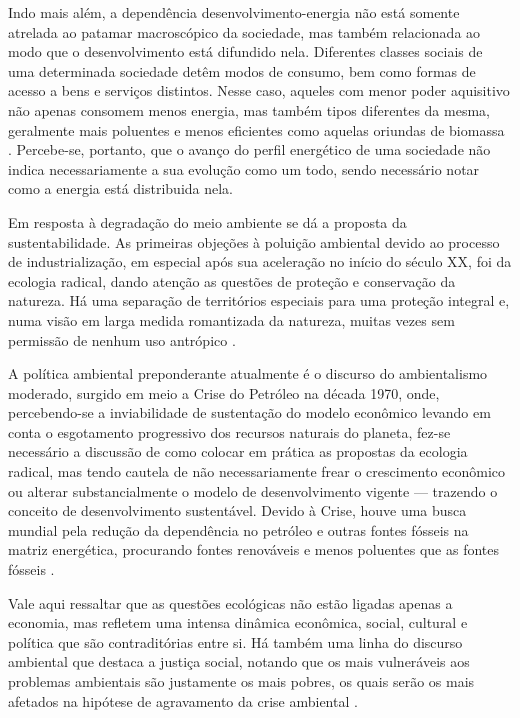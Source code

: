Indo mais além, a dependência desenvolvimento-energia não está somente
atrelada ao patamar macroscópico da sociedade, mas também relacionada
ao modo que o desenvolvimento está difundido nela. Diferentes classes
sociais de uma determinada sociedade detêm modos de consumo, bem como
formas de acesso a bens e serviços distintos. Nesse caso, aqueles com
menor poder aquisitivo não apenas consomem menos energia, mas também
tipos diferentes da mesma, geralmente mais poluentes e menos
eficientes como aquelas oriundas de biomassa
\cite{rippel}. Percebe-se, portanto, que o avanço do perfil energético
de uma sociedade não indica necessariamente a sua evolução como um
todo, sendo necessário notar como a energia está distribuida nela.

Em resposta à degradação do meio ambiente se dá a proposta da
sustentabilidade. As primeiras objeções à poluição ambiental devido ao processo 
de industrialização, em especial após sua aceleração no início do século XX,
foi da ecologia radical, dando atenção as questões de proteção e conservação da natureza.
Há uma separação de territórios especiais para uma proteção integral e, numa
visão em larga medida romantizada da natureza, muitas vezes sem permissão 
de nenhum uso antrópico \cite{jatoba}.

A política ambiental preponderante atualmente é o discurso do ambientalismo moderado, 
surgido em meio a Crise do Petróleo na década 1970, onde, percebendo-se a
inviabilidade de sustentação do modelo econômico levando em conta o esgotamento
progressivo dos recursos naturais do planeta, fez-se necessário a discussão de como 
colocar em prática as propostas da ecologia radical, mas tendo cautela de não 
necessariamente frear o crescimento econômico ou alterar substancialmente o 
modelo de desenvolvimento vigente --- trazendo o conceito de desenvolvimento
sustentável. Devido à Crise, houve uma busca mundial pela redução da 
dependência no petróleo e outras fontes fósseis na matriz energética, 
procurando fontes renováveis e menos poluentes que as fontes fósseis 
\cite{jatoba,epe_eficiencia_2012,rippel}. 

Vale aqui ressaltar que as questões ecológicas não estão ligadas apenas a
economia, mas refletem uma intensa dinâmica econômica, social, cultural e política 
que são contraditórias entre si. Há também uma linha do discurso ambiental que destaca a
justiça social, notando que os mais vulneráveis aos problemas
ambientais são justamente os mais pobres, os quais serão os mais afetados na
hipótese de agravamento da crise ambiental \cite{jatoba}.

